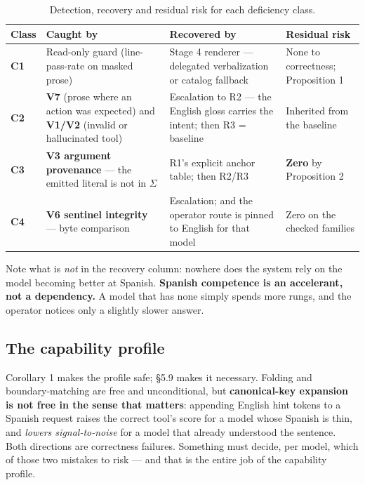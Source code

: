 \begin{table}[htbp]
\centering
\footnotesize
\caption{Detection, recovery and residual risk for each deficiency class.}
\label{tab:deficiency-neutralization}
\begin{tabular}{@{}p{}p{}p{}p{}@{}}
\toprule
\textbf{Class} & \textbf{Caught by} & \textbf{Recovered by} & \textbf{Residual risk} \\
\midrule
\textbf{C1} &
Read-only guard (line-pass-rate on masked prose) &
Stage 4 renderer --- delegated verbalization or catalog fallback &
None to correctness; Proposition 1 \\
\addlinespace
\textbf{C2} &
\textbf{V7} (prose where an action was expected) and \textbf{V1/V2} (invalid or
hallucinated tool) &
Escalation to R2 --- the English gloss carries the intent; then R3 = baseline &
Inherited from the baseline \\
\addlinespace
\textbf{C3} &
\textbf{V3 argument provenance} --- the emitted literal is not in $\Sigma$ &
R1's explicit anchor table; then R2/R3 &
\textbf{Zero} by Proposition 2 \\
\addlinespace
\textbf{C4} &
\textbf{V6 sentinel integrity} --- byte comparison &
Escalation; and the operator route is pinned to English for that model &
Zero on the checked families \\
\bottomrule
\end{tabular}
\end{table}

Note what is \emph{not} in the recovery column: nowhere does the system rely on the
model becoming better at Spanish. \textbf{Spanish competence is an accelerant, not a
dependency.} A model that has none simply spends more rungs, and the operator notices
only a slightly slower answer.

\subsection{The capability profile}
\label{sec:the-capability-profile}

Corollary 1 makes the profile safe; \S5.9 makes it necessary. Folding and
boundary-matching are free and unconditional, but \textbf{canonical-key
expansion is not free in the sense that matters}: appending English hint tokens
to a Spanish request raises the correct tool's score for a model whose Spanish
is thin, and \emph{lowers signal-to-noise} for a model that already understood
the sentence. Both directions are correctness failures. Something must decide,
per model, which of those two mistakes to risk --- and that is the entire job of
the capability profile.

